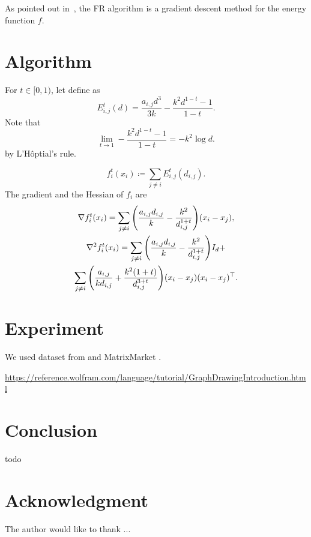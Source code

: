 \documentclass[journal]{IEEEtran}
\newcommand{\defeq}{\coloneqq}
\newcommand{\Lhopital}{L'H\^optial}
\begin{document}
As pointed out in~\cite{tunkelang1999numerical},
the FR algorithm is a gradient descent method for the energy function $f$.

\section{Algorithm} \label{sec:algorithm}

For $t \in [0,1)$, let define as
\begin{equation*}
  E_{i,j}^t(d) = \frac{a_{i,j} d^3}{3k} - \frac{k^2 d^{1-t} - 1}{1-t}.
\end{equation*}
Note that
\begin{equation*}
  \lim_{t \to 1} - \frac{k^2 d^{1-t} - 1}{1-t} = -k^2 \log{d}.
\end{equation*}
by \Lhopital's rule.

\begin{equation*}
  f_i^t(x_i) \defeq \sum_{j \neq i} E_{i,j}^t(d_{i,j}).
\end{equation*}
The gradient and the Hessian of $f_i$ are
\begin{gather*}
  \nabla f_i^t(x_i) = \sum_{j \neq i} \qty(\frac{a_{i,j}d_{i,j}}{k} - \frac{k^2}{d_{i,j}^{1+t}}) (x_i-x_j), \\
  \nabla^2 f_i^t(x_i) = \sum_{j \neq i} \qty(\frac{a_{i,j}d_{i,j}}{k} - \frac{k^2}{d_{i,j}^{1+t}}) I_d +      \\
  \sum_{j \neq i} \qty(\frac{a_{i,j}}{k d_{i,j}} + \frac{k^2(1+t)}{d_{i,j}^{3+t}}) (x_i - x_j)(x_i - x_j)^\top.
\end{gather*}


\section{Experiment} \label{sec:experiment}

We used dataset from \cite{davis2011university} and MatrixMarket \cite{boisvertMatrixMarketWeb1997}.

\url{https://reference.wolfram.com/language/tutorial/GraphDrawingIntroduction.html}

\section{Conclusion} \label{sec:conclusion}

todo

\section*{Acknowledgment}

The author would like to thank ...

\end{document}
